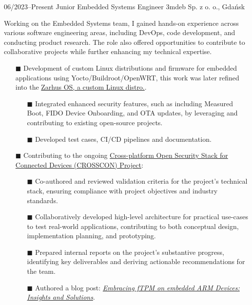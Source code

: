 \documentclass[9pt]{./src/packages/Developer_CV/developercv}
\begin{document}
\begin{entrylist}

    \entry
    {06/2023--Present}
    {Junior Embedded Systems Engineer}
    {3mdeb Sp. z o. o., Gdańsk}
    {
    Working on the Embedded Systems team, I gained hands-on experience across various software engineering areas, including DevOps, code development, and conducting product research. The role also offered opportunities to contribute to collaborative projects while further enhancing my technical expertise.
    \begin{enumerate}
        \raggedright
    \item[$\blacksquare$] Development of custom Linux distributions and firmware for embedded applications using Yocto/Buildroot/OpenWRT, this work was later refined into the \href{https://docs.zarhus.com/}{Zarhus OS, a custom Linux distro.}.
        \begin{enumerate}
            \item[$\blacksquare$] Integrated enhanced security features, such as including Measured Boot, FIDO Device Onboarding, and OTA updates, by leveraging and contributing to existing open-source projects.
            \item[$\blacksquare$] Developed test cases, CI/CD pipelines and documentation.
        \end{enumerate}
        \item[$\blacksquare$] Contributing to the ongoing \href{https://crosscon.eu/}{Cross-platform Open Security Stack for Connected Devices (CROSSCON) Project}:
        \begin{enumerate}
            \item[$\blacksquare$] Co-authored and reviewed validation criteria for the project's technical stack, ensuring compliance with project objectives and industry standards.
            \item[$\blacksquare$] Collaboratively developed high-level architecture for practical use-cases to test real-world applications, contributing to both conceptual design, implementation planning, and prototyping.
            \item[$\blacksquare$] Prepared internal reports on the project's substantive progress, identifying key deliverables and deriving actionable recommendations for the team.
            \item[$\blacksquare$] Authored a blog post: \href{https://crosscon.eu/blog/embracing-ftpm-embedded-arm-devices-insights-and-solutions}{\textit{Embracing fTPM on embedded ARM Devices: Insights and Solutions}}.

\end{enumerate}
\end{enumerate}}
\end{entrylist}
\end{document}
